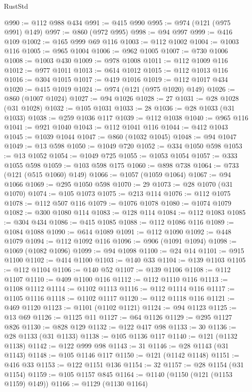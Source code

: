 \begin{lexlean}{RustStd}
\begin{coremodule}
@990 := @112 @988 @434
@991 := @415 @990
@995 := @974 (@121 (@975 @991) @149)
@997 := @860 (@972 @995)
@998 := @94 @997
@999 := @416 @109
@1002 := @165 @999 @69 @116
@1003 := @112 @1002
@1004 := @1003 @116
@1005 := @965 @1004
@1006 := @962 @1005
@1007 := @730 @1006
@1008 := @1003 @430
@1009 := @978 @1008
@1011 := @112 @1009 @116
@1012 := @977 @1011
@1013 := @614 @1012
@1015 := @112 @1013 @116
@1016 := @304 @1015
@1017 := @419 @1016
@1019 := @112 @1017 @434
@1020 := @415 @1019
@1024 := @974 (@121 (@975 @1020) @149)
@1026 := @860 (@1007 @1024)
@1027 := @94 @1026
@1028 := 27
@1031 := @28 @1028 (@31 @1028)
@1032 := @105 @1031
@1033 := 28
@1036 := @28 @1033 (@31 @1033)
@1038 := @259 @1036 @117
@1039 := @112 @1038
@1040 := @965 @116
@1041 := @921 @1040
@1043 := @112 @1041 @116
@1044 := @412 @1043
@1045 := @1039 @1044
@1047 := @860 (@1032 @1045)
@1048 := @94 @1047
@1049 := @13 @598
@1050 := @1049 @720
@1052 := @334 @1050 @598
@1053 := @13 @1052
@1054 := @1049 @725
@1055 := @1053 @1054
@1057 := @333 @1055 @598
@1059 := @103 @598 @175
@1060 := @898 @738
@1064 := @733 (@121 (@515 @1060) @149)
@1066 := @1057 (@1059 @1064)
@1067 := @94 @1066
@1069 := @295 @1050 @598
@1070 := 29
@1073 := @28 @1070 (@31 @1070)
@1074 := @105 @1073
@1075 := @213 @114
@1076 := @112 @1075
@1078 := @112 @507 @116
@1079 := @1076 @1078
@1080 := @1074 @1079
@1082 := @300 @1080 @114
@1083 := @128 @114
@1084 := @112 @1083
@1085 := @304 @434
@1086 := @415 @1085
@1088 := @112 @1086 @116
@1089 := @1084 @1088
@1090 := @614 @1089
@1091 := @112 @1090
@1092 := @448 @1079
@1094 := @112 @1092 @116
@1096 := @906 (@1091 @1094)
@1098 := @1069 (@1082 @1096)
@1099 := @94 @1098
@1100 := @24 @14
@1101 := @915 @1100
@1102 := @414 @1100
@1103 := @140 @33
@1104 := @139 @1103
@1105 := @112 @1104
@1106 := @140 @52
@1107 := @139 @1106
@1108 := @112 @1107
@1110 := @409 @1100 @116
@1112 := @112 @1110 @116
@1113 := @1108 @1112
@1114 := @1102 @1113
@1116 := @112 @1114 @116
@1117 := @1105 @1116
@1118 := @1102 @1117
@1120 := @112 @1118 @116
@1121 := @469 @1120
@1123 := @1101 (@1102 @1121)
@1124 := @94 @1123
@1125 := @13 @69
@1126 := @1125 @11
@1127 := @64 @1126
@1129 := @295 @1127 @826
@1130 := @828 @129
@1132 := @122 @417 @98
@1133 := 30
@1136 := @28 @1133 (@31 @1133)
@1138 := @105 @1136 @117
@1140 := @121 (@1132 @1138)
@1142 := @122 @999 @98
@1143 := 31
@1146 := @28 @1143 (@31 @1143)
@1148 := @105 @1146 @117
@1150 := @121 (@1142 @1148)
@1151 := @416 @33
@1153 := @122 @1151 @136
@1154 := 32
@1157 := @28 @1154 (@31 @1154)
@1159 := @105 @1157 @845
@1164 := @1140 (@1150 (@121 (@1153 @1159) @149))
@1166 := @1129 (@1130 @1164)

\end{coremodule}
\end{lexlean}
